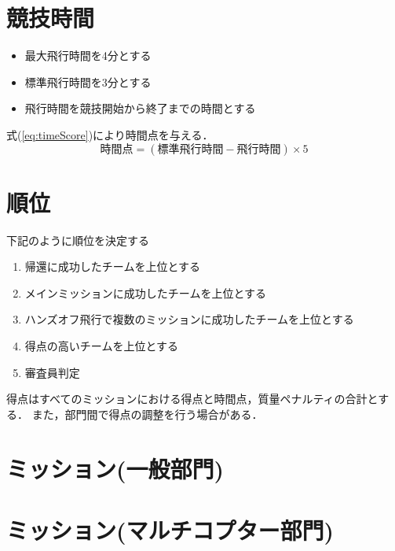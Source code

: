\documentclass[a4paper,12pt,oneside]{jsarticle}
\begin{document}
\section{競技時間}
\begin{itemize}
  \item 最大飛行時間を4分とする
  \item 標準飛行時間を3分とする
  \item 飛行時間を競技開始から終了までの時間とする
\end{itemize}
式(\ref{eq:timeScore})により時間点を与える．
\begin{equation}\label{eq:timeScore}
  時間点 = (標準飛行時間 - 飛行時間)\times 5
\end{equation}

\section{順位}
下記のように順位を決定する
\begin{enumerate}
  \item 帰還に成功したチームを上位とする
  \item メインミッションに成功したチームを上位とする
  \item ハンズオフ飛行で複数のミッションに成功したチームを上位とする
  \item 得点の高いチームを上位とする
  \item 審査員判定
\end{enumerate}
得点はすべてのミッションにおける得点と時間点，質量ペナルティの合計とする．
また，部門間で得点の調整を行う場合がある．
\section{ミッション(一般部門)}

\section{ミッション(マルチコプター部門)}

\end{document}
